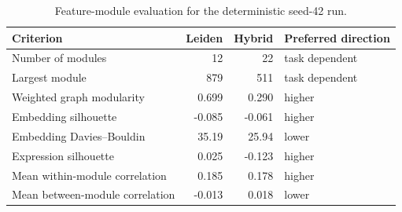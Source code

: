 \documentclass[11pt]{article}
\begin{document}
\begin{table}[t]
\centering
\caption{Feature-module evaluation for the deterministic seed-42 run.}
\label{tab:modulemetrics}
\begin{tabular}{lrrl}
\toprule
Criterion & Leiden & Hybrid & Preferred direction \\
\midrule
Number of modules & 12 & 22 & task dependent \\
Largest module & 879 & 511 & task dependent \\
Weighted graph modularity & 0.699 & 0.290 & higher \\
Embedding silhouette & -0.085 & -0.061 & higher \\
Embedding Davies--Bouldin & 35.19 & 25.94 & lower \\
Expression silhouette & 0.025 & -0.123 & higher \\
Mean within-module correlation & 0.185 & 0.178 & higher \\
Mean between-module correlation & -0.013 & 0.018 & lower \\
\bottomrule
\end{tabular}
\end{table}
\end{document}
